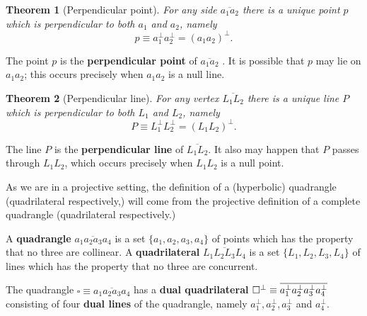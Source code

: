 \documentclass{unswthesis}
\newtheorem{theorem}{Theorem}
\begin{document}
\begin{theorem}[Perpendicular point]
For any side $\overline{a_{1}a_{2}}$ there is a unique point $p$ which is
perpendicular to both $a_{1}$ and $a_{2}$, namely 
\begin{equation*}
p\equiv a_{1}^{\perp}a_{2}^{\perp}=(a_{1}a_{2})^{\perp}. 
\end{equation*}
\end{theorem}

The point $p$ is the \textbf{perpendicular point} of $\overline{a_{1}a_{2}}$%
. It is possible that $p$ may lie on $a_{1}a_{2}$; this occurs precisely
when $a_{1}a_{2}$ is a null line.\newline

\begin{theorem}[Perpendicular line]
For any vertex $\overline{L_{1}L_{2}}$ there is a unique line $P$ which is
perpendicular to both $L_{1}$ and $L_{2}$, namely 
\begin{equation*}
P\equiv L_{1}^{\perp}L_{2}^{\perp}=(L_{1}L_{2})^{\perp}. 
\end{equation*}
\end{theorem}

The line $P$ is the \textbf{perpendicular line} of $\overline{L_{1}L_{2}}$.
It also may happen that $P$ passes through $L_{1}L_{2}$, which occurs
precisely when $L_{1}L_{2}$ is a null point.\newline

\pagebreak

As we are in a projective setting, the definition of a (hyperbolic)
quadrangle (quadrilateral respectively,) will come from the projective
definition of a complete quadrangle (quadrilateral respectively.)\newline

A \textbf{quadrangle} $\overline{a_{1}a_{2}a_{3}a_{4}}$ is a set $%
\{a_{1},a_{2},a_{3},a_{4}\}$ of points which has the property that no three
are collinear. A \textbf{quadrilateral} $\overline{L_{1}L_{2}L_{3}L_{4}}$ is
a set $\{L_{1},L_{2},L_{3},L_{4}\}$ of lines which has the property that no
three are concurrent.\newline

The quadrangle $\square\equiv \overline{a_{1}a_{2}a_{3}a_{4}}$ has a \textbf{%
dual quadrilateral} $\square^{\perp}\equiv\overline{a_{1}^{\perp}a_{2}^{%
\perp}a_{3}^{\perp}a_{4}^{\perp}}$ consisting of four \textbf{dual lines} of
the quadrangle, namely $a_{1}^{\perp},a_{2}^{\perp},a_{3}^{\perp}$ and $%
a_{4}^{\perp}$.\newline
\end{document}
